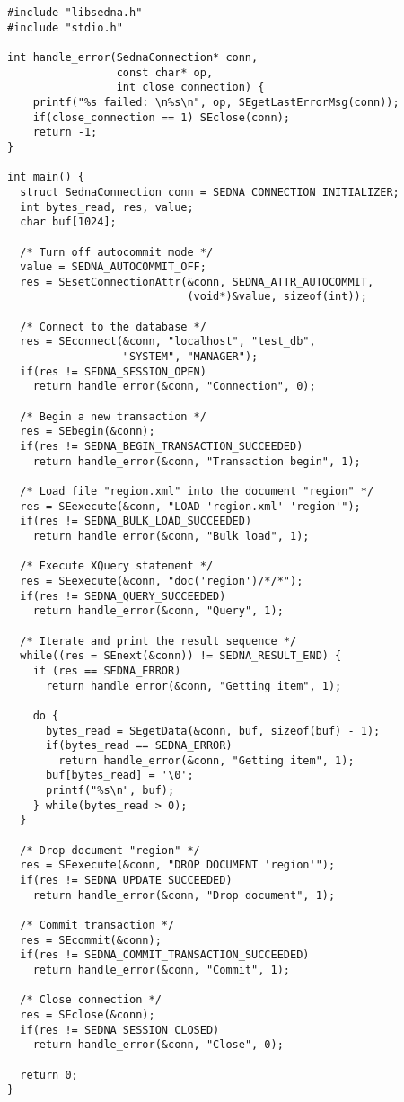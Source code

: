 \documentclass[a4paper,12pt]{article}
\begin{document}
\small{
\begin{verbatim}
#include "libsedna.h"
#include "stdio.h"

int handle_error(SednaConnection* conn,
                 const char* op,
                 int close_connection) {
    printf("%s failed: \n%s\n", op, SEgetLastErrorMsg(conn));
    if(close_connection == 1) SEclose(conn);
    return -1;
}

int main() {
  struct SednaConnection conn = SEDNA_CONNECTION_INITIALIZER;
  int bytes_read, res, value;
  char buf[1024];

  /* Turn off autocommit mode */
  value = SEDNA_AUTOCOMMIT_OFF;
  res = SEsetConnectionAttr(&conn, SEDNA_ATTR_AUTOCOMMIT,
                            (void*)&value, sizeof(int));

  /* Connect to the database */
  res = SEconnect(&conn, "localhost", "test_db",
                  "SYSTEM", "MANAGER");
  if(res != SEDNA_SESSION_OPEN)
    return handle_error(&conn, "Connection", 0);

  /* Begin a new transaction */
  res = SEbegin(&conn);
  if(res != SEDNA_BEGIN_TRANSACTION_SUCCEEDED)
    return handle_error(&conn, "Transaction begin", 1);
    
  /* Load file "region.xml" into the document "region" */
  res = SEexecute(&conn, "LOAD 'region.xml' 'region'");
  if(res != SEDNA_BULK_LOAD_SUCCEEDED)
    return handle_error(&conn, "Bulk load", 1);
    
  /* Execute XQuery statement */
  res = SEexecute(&conn, "doc('region')/*/*");
  if(res != SEDNA_QUERY_SUCCEEDED)
    return handle_error(&conn, "Query", 1);

  /* Iterate and print the result sequence */
  while((res = SEnext(&conn)) != SEDNA_RESULT_END) {
    if (res == SEDNA_ERROR)
      return handle_error(&conn, "Getting item", 1);

    do {
      bytes_read = SEgetData(&conn, buf, sizeof(buf) - 1);
      if(bytes_read == SEDNA_ERROR)
        return handle_error(&conn, "Getting item", 1);
      buf[bytes_read] = '\0';
      printf("%s\n", buf);
    } while(bytes_read > 0);
  }

  /* Drop document "region" */
  res = SEexecute(&conn, "DROP DOCUMENT 'region'");
  if(res != SEDNA_UPDATE_SUCCEEDED)
    return handle_error(&conn, "Drop document", 1);

  /* Commit transaction */
  res = SEcommit(&conn);
  if(res != SEDNA_COMMIT_TRANSACTION_SUCCEEDED)
    return handle_error(&conn, "Commit", 1);

  /* Close connection */
  res = SEclose(&conn);
  if(res != SEDNA_SESSION_CLOSED)
    return handle_error(&conn, "Close", 0);
   
  return 0;
}
\end{verbatim}}
\end{document}
